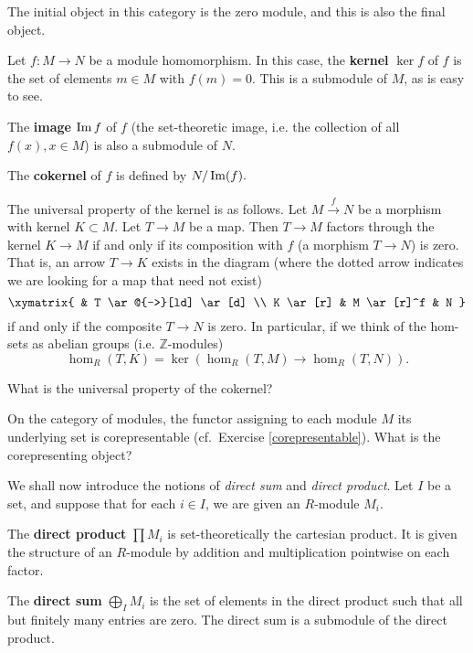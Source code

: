 \begin{exercise} 
The initial object in this category is the zero module, and this is also the
final object. 
\end{exercise} 
\begin{definition} Let $f: M \to N$ be a module homomorphism.
In this case, the \textbf{kernel} $\ker f$ of $f$ is  the set of elements $m
\in M$ with $f(m)=0$. This is
a submodule of $M$, as is easy to see. 

The \textbf{image} $\operatorname{Im} f$ of $f$ (the set-theoretic
image, i.e. the collection of all $f(x), x \in M$) is also a submodule of $N$. 

The
\textbf{cokernel} of $f$ is defined by
\(  N/\operatorname{Im}(f).  \) 
\end{definition}

\begin{exercise} \label{univpropertykernel} 
The universal property of the kernel is as follows. Let $M \stackrel{f}{\to }
N$ be a morphism with kernel $K \subset M$. Let $T \to M$ be a map. Then $T \to M$ factors through the
kernel $K \to M$ if and only if its composition with $f$ (a morphism $T \to N$) is zero. 
That is, an arrow $T \to K$ exists in the diagram (where the dotted arrow
indicates we are looking for a map that need not exist)
\[ \xymatrix{
& T \ar@{-->}[ld] \ar[d]  \\
K \ar[r] &  M \ar[r]^f &  N
}\]
if and only if the composite $T \to N$ is zero.
In particular, if we think of the hom-sets as abelian groups (i.e.
$\mathbb{Z}$-modules)
\[ \hom_R( T,K) = \ker\left( \hom_R(T, M) \to \hom_R(T, N) \right). \]
\end{exercise} 
\begin{exercise} 
What is the universal property of the cokernel?
\end{exercise} 

\begin{exercise} \label{moduleunderlyingsetrepresentable}
On the category of modules, the functor assigning to each module $M$ its
underlying set is corepresentable (cf.\ Exercise \ref{corepresentable}). What
is the corepresenting object? 
\end{exercise} 

We shall now introduce the notions of \emph{direct sum} and \emph{direct
product}. Let $I$ be a set, and suppose that for each $i \in I$, we are given
an $R$-module $M_i$.

\begin{definition} 
The \textbf{direct product} $\prod M_i$ is set-theoretically the cartesian product. It is given
the structure of an $R$-module by addition and multiplication pointwise on
each factor. 
\end{definition} 
\begin{definition} 
The \textbf{direct sum} $\bigoplus_I M_i$ is the set of elements in the direct
product such that all but finitely many entries are zero. The direct sum is a
submodule of the direct product.
\end{definition} 


